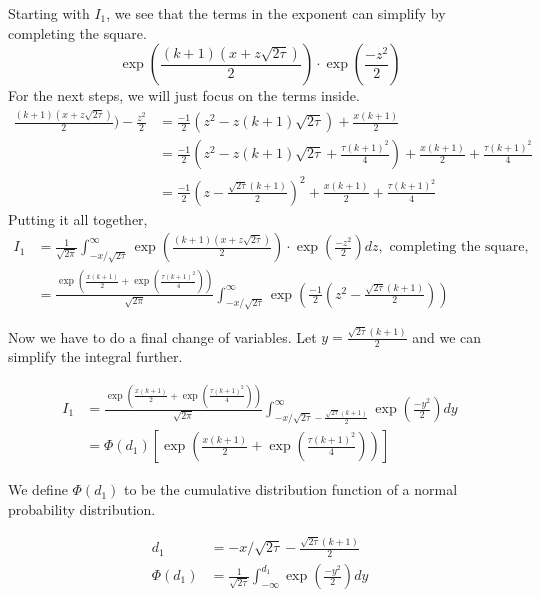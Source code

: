 \documentclass{article}
\begin{document}
Starting with $I_1$, we see that the terms in the exponent can simplify by completing the square.
\begin{equation*}
     \exp(\frac{(k+1)(x+z\sqrt{2\tau})}{2}) \cdot \exp(\frac{-z^2}{2})
\end{equation*}
For the next steps, we will just focus on the terms inside.
\begin{align*}
    \frac{(k+1)(x+z\sqrt{2\tau})}{2}) - \frac{z^2}{2} &= \frac{-1}{2}\left( z^2 - z(k+1)\sqrt{2\tau}\right) + \frac{x(k+1)}{2} \\
    &=  \frac{-1}{2} \left( z^2 - z(k+1)\sqrt{2\tau} + \frac{\tau(k+1)^2}{4}\right) + \frac{x(k+1)}{2} + \frac{\tau(k+1)^2}{4} \\
    &=  \frac{-1}{2} \left( z - \frac{\sqrt{2\tau}(k+1)}{2} \right)^2 + \frac{x(k+1)}{2} + \frac{\tau(k+1)^2}{4}
\end{align*}
Putting it all together,
\begin{align*}
    I_1 &= \frac{1}{\sqrt{2\pi}} \int_{-x/\sqrt{2\tau}}^{\infty} \exp(\frac{(k+1)(x+z\sqrt{2\tau})}{2}) \cdot \exp(\frac{-z^2}{2}) dz, \text{ completing the square,}\\
     &= \frac{\exp(\frac{x(k+1)}{2} + \exp(\frac{\tau(k+1)^2}{4}))}{\sqrt{2\pi}} \int_{-x/\sqrt{2\tau}}^{\infty}
      \exp\left(\frac{-1}{2} \left( z^2 - \frac{\sqrt{2\tau}(k+1)}{2} \right)\right) 
\end{align*}

Now we have to do a final change of variables. Let $y = \frac{\sqrt{2\tau}(k+1)}{2}$
and we can simplify the integral further.

\begin{align*}
    I_1 &= \frac{\exp(\frac{x(k+1)}{2} + \exp(\frac{\tau(k+1)^2}{4}))}{\sqrt{2\pi}} \int_{-x/\sqrt{2\tau} - \frac{\sqrt{2\tau}(k+1)}{2}}^{\infty} \exp(\frac{-y^2}{2}) dy \\
    &= \Phi(d_1) \left[\exp(\frac{x(k+1)}{2} + \exp(\frac{\tau(k+1)^2}{4})) \right] 
\end{align*}

We define $\Phi(d_1)$ to be the cumulative distribution function of a normal probability distribution.

\begin{align*}
    d_1 &= -x/\sqrt{2\tau} - \frac{\sqrt{2\tau}(k+1)}{2} \\
    \Phi(d_1) &= \frac{1}{\sqrt{2\tau}} \int_{-\infty}^{d_1} \exp(\frac{-y^2}{2}) dy
\end{align*}
\end{document}
